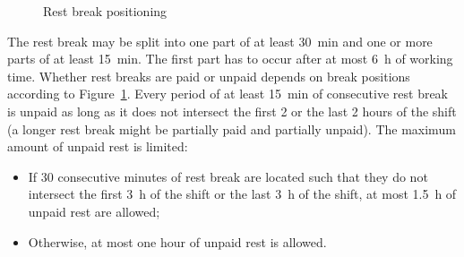 \documentclass[]{amsart}
\theoremstyle{plain}
\begin{document}
\begin{figure}[htp]%
	\centering
	\caption{Rest break positioning~\cite{kletzander2020solving}}
	\label{fig:rest}
\end{figure}
\noindent
The rest break may be split into one part of at least \qty{30}{\minute} and one or more parts of at least \qty{15}{\minute}. The first part has to occur after at most \qty{6}{\hour} of working time.
Whether rest breaks are paid or unpaid depends on break positions according to Figure~\ref{fig:rest}. Every period of at least \qty{15}{\minute} of consecutive rest break is unpaid as long as it does not intersect the first 2 or the last 2 hours of the shift (a longer rest break might be partially paid and partially unpaid). The maximum amount of unpaid rest is limited: 
\begin{itemize}
	\item If 30 consecutive minutes of rest break are located such that they do not intersect the first \qty{3}{\hour} of the shift or the last \qty{3}{\hour} of the shift, at most \qty{1.5}{\hour} of unpaid rest are allowed;
	\item Otherwise, at most one hour of unpaid rest is allowed.
\end{itemize}
\noindent
\end{document}
